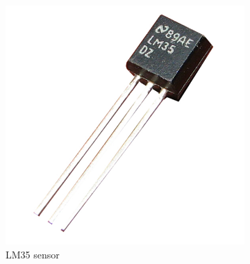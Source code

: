 \documentclass[12pt, a4paper,twoside]{tesi_upf}
\begin{document}
      \begin{figure}
        \centering
        \begin{subfigure}[b]{0.3\textwidth}
                \includegraphics[width=\textwidth]{./Figures/LM35.jpg}
                \caption{LM35 sensor}
                \label{fig:LM35}
        \end{subfigure}%
        ~ %
        \begin{subfigure}[b]{0.3\textwidth}

\end{subfigure}
\end{figure}
\end{document}
